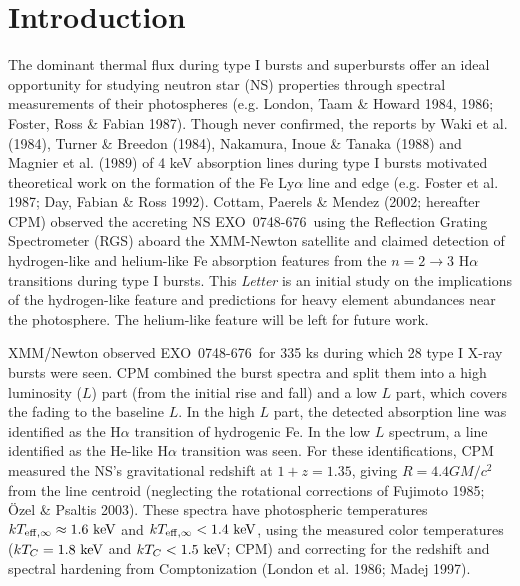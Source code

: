 \documentclass[iop,apjl,letterpaper]{emulateapj}
\newcommand{\EXO}{\mbox{EXO 0748-676}}
\begin{document}

\section{Introduction}

  The dominant thermal flux during type I bursts and superbursts offer
an ideal opportunity for studying neutron star (NS) properties through
spectral measurements of their photospheres (e.g. London, Taam \&
Howard 1984, 1986; Foster, Ross \& Fabian 1987). Though never
confirmed, the reports by Waki et al. (1984), Turner \& Breedon
(1984), Nakamura, Inoue \& Tanaka (1988) and Magnier et al.  (1989) of
4 keV absorption lines during type I bursts motivated theoretical work
on the formation of the Fe Ly$\alpha$ line and edge (e.g. Foster et
al. 1987; Day, Fabian \& Ross 1992). Cottam, Paerels \& Mendez (2002;
hereafter CPM) observed the accreting NS \EXO\ using the Reflection
Grating Spectrometer (RGS) aboard the XMM-Newton satellite and claimed
detection of hydrogen-like and helium-like Fe absorption features from
the $n=2\rightarrow 3$ H$\alpha$ transitions during type I bursts.
This {\it Letter} is an initial study on the implications of the
hydrogen-like feature and predictions for heavy element abundances
near the photosphere. The helium-like feature will be left for future
work.

XMM/Newton observed \EXO\ for 335 ks during which 28 type I X-ray
bursts were seen. CPM combined the burst spectra and split them into a
high luminosity ($L$) part (from the initial rise and fall) and a low
$L$ part, which covers the fading to the baseline $L$. In the high $L$
part, the detected absorption line was identified as the H$\alpha$
transition of hydrogenic Fe. In the low $L$ spectrum, a line
identified as the He-like H$\alpha$ transition was seen. For these
identifications, CPM measured the NS's gravitational redshift at
$1+z=1.35$, giving $R=4.4GM/c^2$ from the line centroid (neglecting
the rotational corrections of Fujimoto 1985; \"Ozel \& Psaltis 2003).
These spectra have photospheric temperatures $kT_{\rm eff,
\infty}\approx 1.6 \ {\rm keV}$ and $kT_{\rm eff, \infty}< 1.4 \ {\rm
keV}$, using the measured color temperatures ($kT_C=1.8 \ {\rm keV}$
and $kT_C<1.5 \ {\rm keV}$; CPM) and correcting for the redshift and
spectral hardening from Comptonization (London et al. 1986; Madej
1997).
\end{document}
